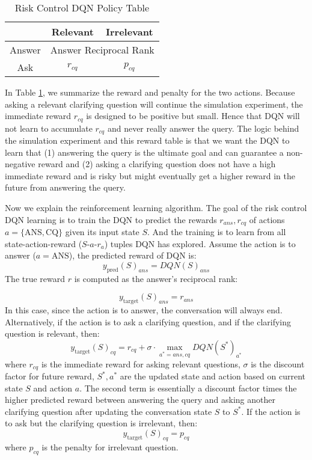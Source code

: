 \documentclass[format=acmsmall, review=False, screen=true]{acmart}
\begin{document}
\begin{table}[htbb]
\caption{Risk Control DQN Policy Table}
\begin{center}
\begin{tabular}{|c|c|c|}
\hline
& Relevant & Irrelevant \\\hline
Answer & \multicolumn{2}{c|}{Answer Reciprocal Rank} \\\hline
Ask & $r_{cq}$ & $p_{cq}$ \\\hline
\end{tabular}
\label{DQN Policy table}
\end{center}
\end{table}

In Table \ref{DQN Policy table}, we summarize the reward and penalty for the two actions. Because asking a relevant clarifying question will continue the simulation experiment, the immediate reward $r_{cq}$ is designed to be positive but small. Hence that DQN will not learn to accumulate $r_{cq}$ and never really answer the query. The logic behind the simulation experiment and this reward table is that we want the DQN to learn that (1) answering the query is the ultimate goal and can guarantee a non-negative reward and (2) asking a clarifying question does not have a high immediate reward and is risky but might eventually get a higher reward in the future from answering the query.

Now we explain the reinforcement learning algorithm. The goal of the risk control DQN learning is to train the DQN to predict the rewards $r_{ans}, r_{cq}$ of actions $a=\{\text{ANS},\text{CQ}\}$ given its input state $S$. And the training is to learn from all state-action-reward ($S$-$a$-$r_a$) tuples DQN has explored. Assume the action is to answer ($a=\text{ANS}$), the predicted reward of DQN is: \begin{equation}
y_{\text{pred}}(S)_{ans} = DQN(S)_{ans}
\end{equation}
The true reward $r$ is computed as the answer's reciprocal rank:

\begin{equation}
y_{\text{target}}(S)_{ans} = r_{ans} 
\end{equation}
In this case, since the action is to answer, the conversation will always end. Alternatively, if the action is to ask a clarifying question, and if the clarifying question is relevant, then:
\begin{equation}
y_{\text{target}}(S)_{cq} = r_{cq} + \sigma \cdot \max_{a^* = ans, cq} DQN(S^*)_{a^*}
\end{equation}
where $r_{cq}$ is the immediate reward for asking relevant questions, $\sigma$ is the discount factor for future reward, $S^*, a^*$ are the updated state and action based on current state $S$ and action $a$. The second term is essentially a discount factor times the higher predicted reward between answering the query and asking another clarifying question after updating the conversation state $S$ to $S^*$. 
If the action is to ask but the clarifying question is irrelevant, then:
\begin{equation}
y_{\text{target}}(S)_{cq} = p_{cq}
\end{equation}
where $p_{cq}$ is the penalty for irrelevant question.
\end{document}
